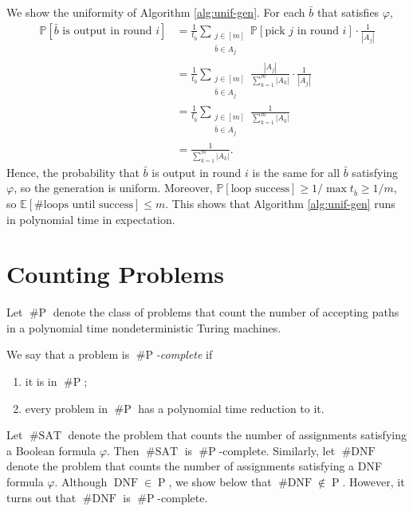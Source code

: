 \documentclass[letterpaper, reqno,11pt]{article}
\newcommand{\PP}{\mathbb{P}}
\newcommand{\EE}{\mathbb{E}}
\DeclareMathOperator{\shP}{\# P}
\DeclareMathOperator{\shSAT}{\# SAT}
\DeclareMathOperator{\shDNF}{\# DNF}
\DeclareMathOperator{\DNF}{DNF}
\DeclareMathOperator{\Poly}{P}
\begin{document}
We show the uniformity of Algorithm \ref{alg:unif-gen}. For each $\bar b$ that satisfies $\varphi$,
\begin{align*}
  \PP\left[\text{$\bar b$ is output in round $i$}\right] &= \frac{1}{t_{\bar b}} \sum_{\substack{j \in [m] \\ \bar b \in A_j}} \PP[\text{pick $j$ in round $i$}] \cdot \frac{1}{\left|A_j\right|} \\
  &= \frac{1}{t_{\bar b}} \sum_{\substack{j \in [m] \\ \bar b \in A_j}} \frac{\left|A_j\right|}{\sum_{k = 1}^m \left|A_k\right|} \cdot \frac{1}{\left|A_j\right|} \\
  &= \frac{1}{t_{\bar b}} \sum_{\substack{j \in [m] \\ \bar b \in A_j}} \frac{1}{\sum_{k = 1}^m \left|A_k\right|} \\
  &= \frac{1}{\sum_{k = 1}^m \left|A_k\right|}.
\end{align*}
Hence, the probability that $\bar b$ is output in round $i$ is the same for all $\bar b$ satisfying $\varphi$, so the generation is uniform. Moreover, $\PP[\text{loop success}] \geq 1/\max t_{\bar b}\geq 1/m$, so $\EE[\text{\# loops until success}] \leq m$. This shows that Algorithm \ref{alg:unif-gen} runs in polynomial time in expectation.

\section{Counting Problems}

\begin{definition}
  Let $\shP$ denote the class of problems that count the number of accepting paths in a polynomial time nondeterministic Turing machines.
\end{definition}

\begin{definition}
  We say that a problem is \emph{$\shP$-complete} if
  \begin{enumerate}[label=(\alph*), itemsep=0pt]
    \item it is in $\shP$;
    \item every problem in $\shP$ has a polynomial time reduction to it.
  \end{enumerate}
\end{definition}

Let $\shSAT$ denote the problem that counts the number of assignments satisfying a Boolean formula $\varphi$. Then $\shSAT$ is $\shP$-complete. Similarly, let $\shDNF$ denote the problem that counts the number of assignments satisfying a DNF formula $\varphi$. Although $\DNF \in \Poly$, we show below that $\shDNF \not \in \Poly$. However, it turns out that $\shDNF$ is $\shP$-complete.
\end{document}
